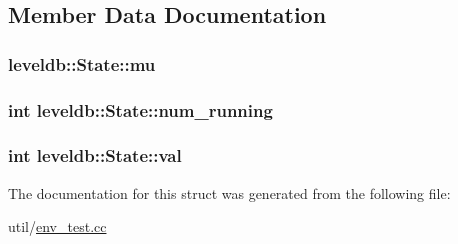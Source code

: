 \subsection{Member Data Documentation}
\hypertarget{structleveldb_1_1_state_aa5b0e460a6a87debeb211c47dce8ddd3}{}
\subsubsection[{mu}]{ leveldb\+::\+State\+::mu}\label{structleveldb_1_1_state_aa5b0e460a6a87debeb211c47dce8ddd3}
\hypertarget{structleveldb_1_1_state_a6e84d8550d17c6c3edda2e114a634e61}{}
\subsubsection[{num\+\_\+running}]{\setlength{\rightskip}{0pt plus 5cm}int leveldb\+::\+State\+::num\+\_\+running}\label{structleveldb_1_1_state_a6e84d8550d17c6c3edda2e114a634e61}
\hypertarget{structleveldb_1_1_state_adfc3479f732e7396e735991e48963981}{}
\subsubsection[{val}]{\setlength{\rightskip}{0pt plus 5cm}int leveldb\+::\+State\+::val}\label{structleveldb_1_1_state_adfc3479f732e7396e735991e48963981}


The documentation for this struct was generated from the following file\+:\begin{DoxyCompactItemize}
\item 
util/\hyperlink{env__test_8cc}{env\+\_\+test.\+cc}\end{DoxyCompactItemize}
